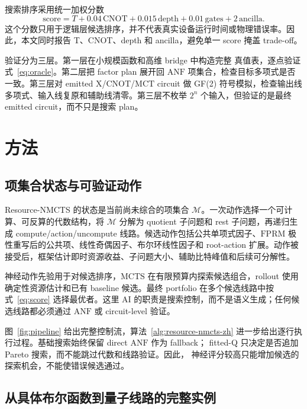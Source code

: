 \documentclass[UTF8,fontset=fandol,11pt]{ctexart}
\newcommand{\method}{Resource-NMCTS}
\newcommand{\anf}{\ensuremath{\mathrm{ANF}}}
\newcommand{\fprm}{\ensuremath{\mathrm{FPRM}}}
\newcommand{\mcts}{\ensuremath{\mathrm{MCTS}}}
\newcommand{\mct}{\ensuremath{\mathrm{MCT}}}
\newcommand{\score}{\ensuremath{\mathrm{score}}}
\newcommand{\ttable}{真值表}
\begin{document}
搜索排序采用统一加权分数
\begin{equation}
  \score = T + 0.04\,\mathrm{CNOT} + 0.015\,\mathrm{depth}
         + 0.01\,\mathrm{gates} + 2\,\mathrm{ancilla}.
  \label{eq:score}
\end{equation}
这个分数只用于逻辑层候选排序，并不代表真实设备运行时间或物理错误率。因此，本文同时报告 T、CNOT、depth 和 ancilla，避免单一 score 掩盖 trade-off。

验证分为三层。第一层在小规模函数和高维 bridge 中构造完整 \ttable{}，逐点验证式~\eqref{eq:oracle}。第二层把 factor plan 展开回 \anf{} 项集合，检查目标多项式是否一致。第三层对 emitted X/CNOT/\mct{} circuit 做 GF(2) 符号模拟，检查输出线多项式、输入线复原和辅助线清零。第三层不枚举 $2^n$ 个输入，但验证的是最终 emitted circuit，而不只是搜索 plan。

\section{方法}

\subsection{项集合状态与可验证动作}

\method{} 的状态是当前尚未综合的项集合 $\mathcal{M}$。一次动作选择一个可计算、可反算的代数结构，将 $\mathcal{M}$ 分解为 quotient 子问题和 rest 子问题，再递归生成 compute/action/uncompute 线路。候选动作包括公共单项式因子、\fprm{} 极性重写后的公共项、线性奇偶因子、布尔环线性因子和 root-action 扩展。动作被接受后，框架估计即时资源收益、子问题大小、辅助比特峰值和后续可分解性。

神经动作先验用于对候选排序，\mcts{} 在有限预算内探索候选组合，rollout 使用确定性资源估计和已有 baseline 候选。最终 portfolio 在多个候选线路中按式~\eqref{eq:score} 选择最优者。这里 AI 的职责是搜索控制，而不是语义生成；任何候选线路都必须通过 \anf{} 或 circuit-level 验证。

图~\ref{fig:pipeline} 给出完整控制流，算法~\ref{alg:resource-nmcts-zh}
进一步给出逐行执行过程。基础搜索始终保留 direct \anf{} 作为 fallback；
fitted-Q 只决定是否追加 Pareto 搜索，而不能跳过代数和线路验证。因此，
神经评分较高只能增加候选的探索机会，不能使错误候选通过。



\subsection{从具体布尔函数到量子线路的完整实例}
\label{sec:worked-example-zh}
\end{document}

